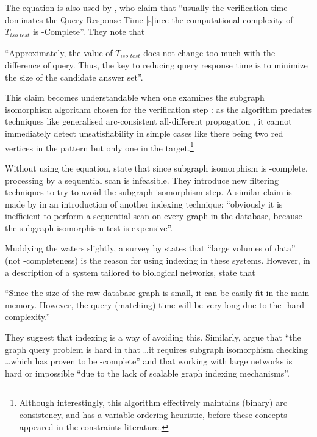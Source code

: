 \documentclass[twoside,11pt]{article}
\begin{document}
The equation is also used by , who claim that ``usually the
verification time dominates the Query Response Time [s]ince the computational complexity of
$T_{\mathit{iso\_test}}$ is \NP-Complete''. They note that \begin{displayquote}``Approximately, the
    value of $T_{\mathit{iso\_test}}$ does not change too much with the difference of query. Thus,
the key to reducing query response time is to minimize the size of the candidate answer
set''.\end{displayquote} This claim becomes understandable when one examines the subgraph
isomorphism algorithm chosen for the verification step \cite{DBLP:journals/jacm/Ullmann76}: as the
algorithm predates techniques like generalised arc-consistent all-different propagation
\cite{DBLP:conf/aaai/Regin94}, it cannot immediately detect unsatisfiability in simple cases like
there being two red vertices in the pattern but only one in the target.\footnote{Although
interestingly, this algorithm effectively maintains (binary) arc consistency, and has a
variable-ordering heuristic, before these concepts appeared in the constraints literature.}

Without using the equation,  state that since subgraph
isomorphism is \NP-complete, processing by a sequential scan is infeasible. They introduce new
filtering techniques to try to avoid the subgraph isomorphism step. A similar claim is made by
 in an introduction of another indexing technique: ``obviously it is
inefficient to perform a sequential scan on every graph in the database, because the subgraph
isomorphism test is expensive''.

Muddying the waters slightly, a survey by  states that
``large volumes of data'' (not \NP-completeness) is the reason for using indexing in these systems.
However, in a description of a system tailored to biological networks,
 state that \begin{displayquote}``Since the size of the raw database
    graph is small, it can be easily fit in the main memory.  However, the query (matching) time
will be very long due to the \NP-hard complexity.''\end{displayquote} They suggest that indexing is
a way of avoiding this. Similarly,  argue that ``the graph query
problem is hard in that \ldots it requires subgraph isomorphism checking \ldots which has proven to
be \NP-complete'' and that working with large networks is hard or impossible ``due to the lack of
scalable graph indexing mechanisms''.
\end{document}
